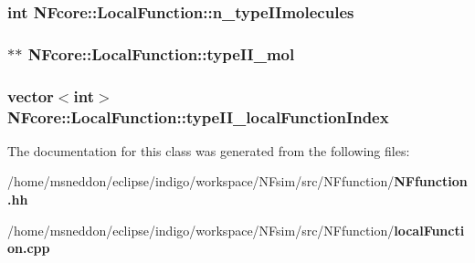 \subsubsection{\setlength{\rightskip}{0pt plus 5cm}int {\bf NFcore::LocalFunction::n\_\-typeIImolecules}\hspace{0.3cm}{\tt  [protected]}}\label{classNFcore_1_1LocalFunction_02acb589165bf598387771403bd78e04}


\subsubsection{$\ast$$\ast$ {\bf NFcore::LocalFunction::typeII\_\-mol}\hspace{0.3cm}{\tt  [protected]}}\label{classNFcore_1_1LocalFunction_18a40f1cc4dba13502a542c60aa3961d}


\subsubsection{\setlength{\rightskip}{0pt plus 5cm}vector$<$int$>$ {\bf NFcore::LocalFunction::typeII\_\-localFunctionIndex}\hspace{0.3cm}{\tt  [protected]}}\label{classNFcore_1_1LocalFunction_90a0774ef85096dbdd99ccabcc045553}




The documentation for this class was generated from the following files:\begin{CompactItemize}
\item 
/home/msneddon/eclipse/indigo/workspace/NFsim/src/NFfunction/{\bf NFfunction.hh}\item 
/home/msneddon/eclipse/indigo/workspace/NFsim/src/NFfunction/{\bf localFunction.cpp}\end{CompactItemize}
